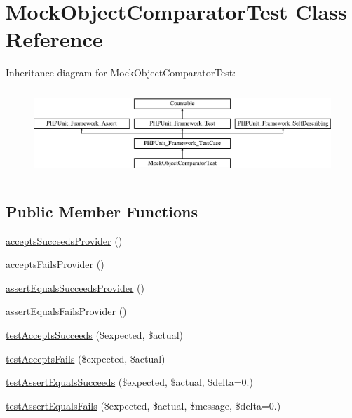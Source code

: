 \hypertarget{class_sebastian_bergmann_1_1_comparator_1_1_mock_object_comparator_test}{}\section{Mock\+Object\+Comparator\+Test Class Reference}
\label{class_sebastian_bergmann_1_1_comparator_1_1_mock_object_comparator_test}
Inheritance diagram for Mock\+Object\+Comparator\+Test\+:\begin{figure}[H]
\begin{center}
\leavevmode
\includegraphics[height=3.303835cm]{class_sebastian_bergmann_1_1_comparator_1_1_mock_object_comparator_test}
\end{center}
\end{figure}
\subsection*{Public Member Functions}
\begin{DoxyCompactItemize}
\item 
\mbox{\hyperlink{class_sebastian_bergmann_1_1_comparator_1_1_mock_object_comparator_test_a2ca71e8095ac10e058cd9d7a68da8608}{accepts\+Succeeds\+Provider}} ()
\item 
\mbox{\hyperlink{class_sebastian_bergmann_1_1_comparator_1_1_mock_object_comparator_test_a9ea19e26cacbca06356c2f229079f8a1}{accepts\+Fails\+Provider}} ()
\item 
\mbox{\hyperlink{class_sebastian_bergmann_1_1_comparator_1_1_mock_object_comparator_test_acb6bc1b6e9d32990bdd287f8b590a5fa}{assert\+Equals\+Succeeds\+Provider}} ()
\item 
\mbox{\hyperlink{class_sebastian_bergmann_1_1_comparator_1_1_mock_object_comparator_test_a3cc10e39239b6e3f3fda1d34c0fb1c14}{assert\+Equals\+Fails\+Provider}} ()
\item 
\mbox{\hyperlink{class_sebastian_bergmann_1_1_comparator_1_1_mock_object_comparator_test_a907ea73398b22f4a8cf37728cfc981e3}{test\+Accepts\+Succeeds}} (\$expected, \$actual)
\item 
\mbox{\hyperlink{class_sebastian_bergmann_1_1_comparator_1_1_mock_object_comparator_test_afe5eff1a1b7049f973a035117a7e0df1}{test\+Accepts\+Fails}} (\$expected, \$actual)
\item 
\mbox{\hyperlink{class_sebastian_bergmann_1_1_comparator_1_1_mock_object_comparator_test_aad90dcf32f0451135282025c43fb9661}{test\+Assert\+Equals\+Succeeds}} (\$expected, \$actual, \$delta=0.)
\item 
\mbox{\hyperlink{class_sebastian_bergmann_1_1_comparator_1_1_mock_object_comparator_test_aaad96b55030caa2544741f25464f9756}{test\+Assert\+Equals\+Fails}} (\$expected, \$actual, \$message, \$delta=0.)
\end{DoxyCompactItemize}
